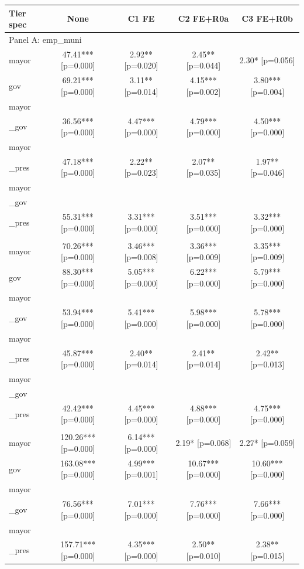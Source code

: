 \begin{tabular}{lcccc}
\toprule
Tier spec & None & C1 FE & C2 FE+R0a & C3 FE+R0b \\
\midrule
\multicolumn{5}{l}{Panel A: emp\_muni} \\
mayor & 47.41*** [p=0.000] & 2.92** [p=0.020] & 2.45** [p=0.044] & 2.30* [p=0.056] \\
gov & 69.21*** [p=0.000] & 3.11** [p=0.014] & 4.15*** [p=0.002] & 3.80*** [p=0.004] \\
mayor\\_gov & 36.56*** [p=0.000] & 4.47*** [p=0.000] & 4.79*** [p=0.000] & 4.50*** [p=0.000] \\
mayor\\_pres & 47.18*** [p=0.000] & 2.22** [p=0.023] & 2.07** [p=0.035] & 1.97** [p=0.046] \\
mayor\\_gov\\_pres & 55.31*** [p=0.000] & 3.31*** [p=0.000] & 3.51*** [p=0.000] & 3.32*** [p=0.000] \\
\addlinespace
\multicolumn{5}{l}{Panel B: bin\_muni} \\
mayor & 70.26*** [p=0.000] & 3.46*** [p=0.008] & 3.36*** [p=0.009] & 3.35*** [p=0.009] \\
gov & 88.30*** [p=0.000] & 5.05*** [p=0.000] & 6.22*** [p=0.000] & 5.79*** [p=0.000] \\
mayor\\_gov & 53.94*** [p=0.000] & 5.41*** [p=0.000] & 5.98*** [p=0.000] & 5.78*** [p=0.000] \\
mayor\\_pres & 45.87*** [p=0.000] & 2.40** [p=0.014] & 2.41** [p=0.014] & 2.42** [p=0.013] \\
mayor\\_gov\\_pres & 42.42*** [p=0.000] & 4.45*** [p=0.000] & 4.88*** [p=0.000] & 4.75*** [p=0.000] \\
\addlinespace
\multicolumn{5}{l}{Panel C: own\_muni} \\
mayor & 120.26*** [p=0.000] & 6.14*** [p=0.000] & 2.19* [p=0.068] & 2.27* [p=0.059] \\
gov & 163.08*** [p=0.000] & 4.99*** [p=0.001] & 10.67*** [p=0.000] & 10.60*** [p=0.000] \\
mayor\\_gov & 76.56*** [p=0.000] & 7.01*** [p=0.000] & 7.76*** [p=0.000] & 7.66*** [p=0.000] \\
mayor\\_pres & 157.71*** [p=0.000] & 4.35*** [p=0.000] & 2.50** [p=0.010] & 2.38** [p=0.015] \\

\end{tabular}
